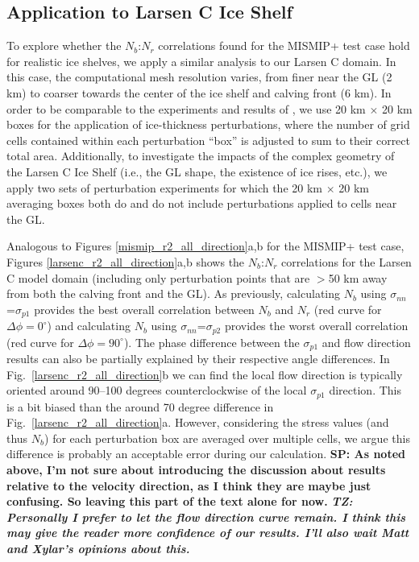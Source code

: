 \documentclass[tc, manuscript]{copernicus}
\begin{document}
\subsection{Application to Larsen C Ice Shelf}

To explore whether the $N_b$:$N_r$ correlations found for the MISMIP+ test case hold for realistic ice shelves, we apply a similar analysis to our Larsen C domain. In this case, the computational mesh resolution varies, from finer near the GL (2 km) to coarser towards the center of the ice shelf and calving front (6 km). In order to be comparable to the experiments and results of \citet{reese2018}, we use 20 km $\times$ 20 km boxes for the application of ice-thickness perturbations, where the number of grid cells contained within each perturbation ``box'' is adjusted to sum to their correct total area. Additionally, to investigate the impacts of the complex geometry of the Larsen C Ice Shelf (i.e., the GL shape, the existence of ice rises, etc.), we apply two sets of perturbation experiments for which the 20 km $\times$ 20 km averaging boxes both do and do not include perturbations applied to cells near the GL. %

Analogous to Figures \ref{mismip_r2_all_direction}a,b for the MISMIP+ test case, Figures \ref{larsenc_r2_all_direction}a,b shows the $N_b$:$N_r$ correlations for the Larsen C model domain (including only perturbation points that are $>$50 km away from both the calving front and the GL). As previously, calculating $N_b$ using $\sigma_{nn}$=$\sigma_{p1}$ provides the best overall correlation between $N_b$ and $N_r$ (red curve for $\Delta\phi=0^\circ$) and calculating $N_b$ using $\sigma_{nn}$=$\sigma_{p2}$ provides the worst overall correlation (red curve for $\Delta\phi=90^\circ$). The phase difference between the $\sigma_{p1}$ and flow direction results can also be partially explained by their respective angle differences. In Fig.~\ref{larsenc_r2_all_direction}b we can find the local flow direction is typically oriented around 90--100 degrees counterclockwise of the local $\sigma_{p1}$ direction. This is a bit biased than the around 70 degree difference in Fig.~\ref{larsenc_r2_all_direction}a. However, considering the stress values (and thus $N_b$) for each perturbation box are averaged over multiple cells, we argue this difference is probably an acceptable error during our calculation. \textbf{SP: As noted above, I'm not sure about introducing the discussion about results relative to the velocity direction, as I think they are maybe just confusing. So leaving this part of the text alone for now.} \textit{\textbf{TZ: Personally I prefer to let the flow direction curve remain. I think this may give the reader more confidence of our results. I'll also wait Matt and Xylar's opinions about this.}} 
\end{document}
